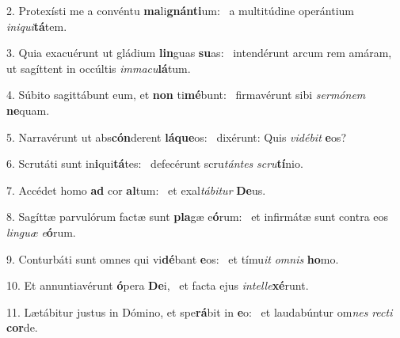 2. Protexísti me a convéntu \textbf{ma}li\textbf{gnán}\textbf{ti}um: \ast\  a multitúdine operántium \textit{in}\textit{i}\textit{qui}\textbf{tá}tem.\

3. Quia exacuérunt ut gládium \textbf{lin}guas \textbf{su}as: \ast\  intendérunt arcum rem amáram, ut sagíttent in occúltis \textit{im}\textit{ma}\textit{cu}\textbf{lá}tum.\

4. Súbito sagittábunt eum, et \textbf{non} ti\textbf{mé}bunt: \ast\  firmavérunt sibi \textit{ser}\textit{mó}\textit{nem} \textbf{ne}quam.\

5. Narravérunt ut abs\textbf{cón}derent \textbf{lá}\textbf{que}os: \ast\  dixérunt: Quis \textit{vi}\textit{dé}\textit{bit} \textbf{e}os?\

6. Scrutáti sunt in\textbf{i}qui\textbf{tá}tes: \ast\  defecérunt scru\textit{tán}\textit{tes} \textit{scru}\textbf{tí}nio.\

7. Accédet homo \textbf{ad} cor \textbf{al}tum: \ast\  et exal\textit{tá}\textit{bi}\textit{tur} \textbf{De}us.\

8. Sagíttæ parvulórum factæ sunt \textbf{pla}gæ e\textbf{ó}rum: \ast\  et infirmátæ sunt contra eos \textit{lin}\textit{guæ} \textit{e}\textbf{ó}rum.\

9. Conturbáti sunt omnes qui vi\textbf{dé}bant \textbf{e}os: \ast\  et tímu\textit{it} \textit{om}\textit{nis} \textbf{ho}mo.\

10. Et annuntiavérunt \textbf{ó}pera \textbf{De}i, \ast\  et facta ejus \textit{in}\textit{tel}\textit{le}\textbf{xé}runt.\

11. Lætábitur justus in Dómino, et spe\textbf{rá}bit in \textbf{e}o: \ast\  et laudabúntur om\textit{nes} \textit{rec}\textit{ti} \textbf{cor}de.\

